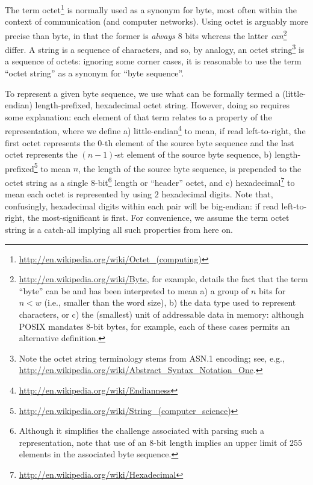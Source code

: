 %


The term octet\footnote{
\url{http://en.wikipedia.org/wiki/Octet_(computing)}
} is normally used as a synonym for byte, most often within the context
of communication (and computer networks).  Using octet is arguably more 
precise than byte, in that the former is {\em always} $8$ bits whereas
the latter {\em can}\footnote{
\url{http://en.wikipedia.org/wiki/Byte}, for example, details the fact
that the term ``byte'' can be and has been interpreted to mean
a) a group of $n$ bits for $n < w$ (i.e., smaller than the word size),
b) the data type used to represent characters,
   or
c) the (smallest) unit of addressable data in memory:
although POSIX mandates $8$-bit bytes, for example, each of these cases
permits an alternative definition.  
} differ.  A string is a sequence of characters, and so, by analogy, an
octet string\footnote{
Note the octet string terminology stems from ASN.1 encoding; see, e.g., 
\url{http://en.wikipedia.org/wiki/Abstract_Syntax_Notation_One}.
} is a sequence of octets: ignoring some corner cases, it is reasonable 
to use the term ``octet string'' as a synonym for ``byte sequence''.

To represent a given byte sequence, we use what can be formally termed
a (little-endian) length-prefixed, hexadecimal octet string.  However,
doing so requires some explanation: each element of that term relates
to a property of the representation, where we define
a) little-endian\footnote{
   \url{http://en.wikipedia.org/wiki/Endianness}
   } to mean, if read left-to-right,
   the first octet represents the     $0$-th element of the source byte sequence
   and
   the last  octet represents the $(n-1)$-st element of the source byte sequence,
b) length-prefixed\footnote{
   \url{http://en.wikipedia.org/wiki/String_(computer_science)}
   } to mean $n$, the length of the source byte sequence, is prepended 
   to the octet string as a single $8$-bit\footnote{
   Although it simplifies the challenge associated with parsing such a 
   representation, note that use of an $8$-bit length implies an upper 
   limit of $255$ elements in the associated byte sequence.
   } length or ``header'' octet,
   and
c) hexadecimal\footnote{
   \url{http://en.wikipedia.org/wiki/Hexadecimal}
   } to mean each octet is represented by using $2$ hexadecimal digits.  
   Note that, confusingly, hexadecimal digits within each pair will be
   big-endian: if read left-to-right, the most-significant is first.
For convenience, we assume the term octet string is a catch-all implying
all such properties from here on.

